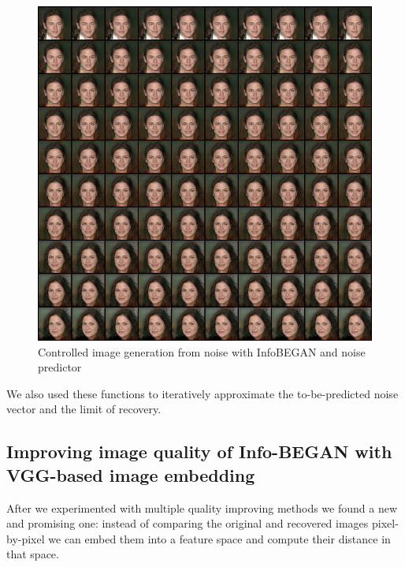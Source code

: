 \documentclass{egpubl}
\begin{document}
\begin{figure}[!htb]
	\centering
	\includegraphics[width=1\linewidth]{pic/InfoBegan_varied_result}
	\caption{Controlled image generation from noise with InfoBEGAN and noise predictor}
	
\end{figure}

We also used these functions to iteratively approximate the to-be-predicted noise vector and the limit of recovery.



\subsection{Improving image quality of Info-BEGAN with VGG-based image embedding}

After we experimented with multiple quality improving methods we found a new and promising one: instead of comparing the original and recovered images pixel-by-pixel we can embed them into a feature space and compute their distance in that space.
\\
\end{document}
